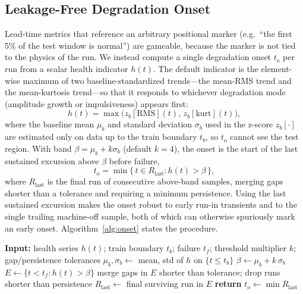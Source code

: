 \documentclass[IJPHM, 2026, 0]{PHMSociety}
\begin{document}
\subsection{Leakage-Free Degradation Onset}
Lead-time metrics that reference an arbitrary positional marker (e.g.\ ``the first 5\% of the test window is normal'') are gameable, because the marker is not tied to the physics of the run. We instead compute a single degradation onset $t_o$ per run from a scalar health indicator $h(t)$. The default indicator is the element-wise maximum of two baseline-standardized trends---the mean-RMS trend and the mean-kurtosis trend---so that it responds to whichever degradation mode (amplitude growth or impulsiveness) appears first:
\begin{equation}
h(t) = \max\!\big(z_b[\text{RMS}](t),\, z_b[\text{kurt}](t)\big),
\label{eq:health}
\end{equation}
where the baseline mean $\mu_b$ and standard deviation $\sigma_b$ used in the z-score $z_b[\cdot]$ are estimated only on data up to the train boundary $t_b$, so $t_o$ cannot see the test region. With band $\beta = \mu_b + k\sigma_b$ (default $k=4$), the onset is the start of the last sustained excursion above $\beta$ before failure,
\begin{equation}
t_o = \min\{\, t \in R_{\text{last}} : h(t) > \beta \,\},
\label{eq:onset}
\end{equation}
where $R_{\text{last}}$ is the final run of consecutive above-band samples, merging gaps shorter than a tolerance and requiring a minimum persistence. Using the last sustained excursion makes the onset robust to early run-in transients and to the single trailing machine-off sample, both of which can otherwise spuriously mark an early onset. Algorithm~\ref{alg:onset} states the procedure.

\begin{algorithm}
\caption{Leakage-free terminal degradation onset}
\label{alg:onset}
\begin{algorithmic}[1]
\State \textbf{Input:} health series $h(t)$; train boundary $t_b$; failure $t_f$; threshold multiplier $k$; gap/persistence tolerances
\State $\mu_b, \sigma_b \gets$ mean, std of $h$ on $\{t \le t_b\}$
\State $\beta \gets \mu_b + k\,\sigma_b$
\State $E \gets \{t < t_f : h(t) > \beta\}$ 
\State merge gaps in $E$ shorter than tolerance; drop runs shorter than persistence
\State $R_{\text{last}} \gets$ final surviving run in $E$
\State \textbf{return} $t_o \gets \min R_{\text{last}}$
\end{algorithmic}
\end{algorithm}
\end{document}
